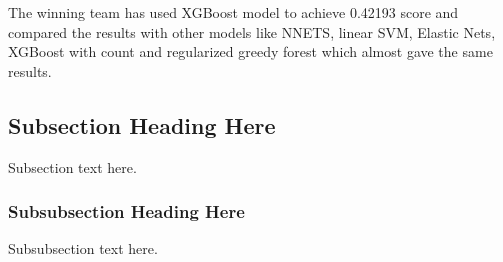 \documentclass[conference, onecolumn]{IEEEtran}
\begin{document}
The winning team has used XGBoost model to achieve 0.42193 score and compared the results with other models like NNETS, linear SVM, Elastic Nets, XGBoost with count and regularized greedy forest which almost gave the same results.


\subsection{Subsection Heading Here}
Subsection text here.


\subsubsection{Subsubsection Heading Here}
Subsubsection text here.


%
%



%
%
\end{document}
